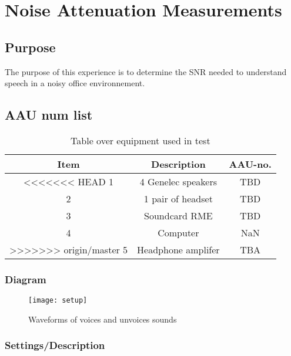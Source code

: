 \section{Noise Attenuation Measurements}

\subsection{Purpose}

The purpose of this experience is to determine the SNR needed to understand speech in a noisy office environnement.

\subsection{AAU num list}

\begin{table}[h]
	\centering
	
	\begin{tabular}{ c c c } \toprule
		{Item} & {Description} & {AAU-no}. \\ \bottomrule 
<<<<<<< HEAD
		1      &  4 Genelec speakers						& TBD	\\
		2      &  1 pair of headset						& TBD		\\
		3      &  Soundcard RME                      	& TBD		\\
		4      &  Computer								   & NaN		\\  

>>>>>>> origin/master
		5      &  Headphone amplifer    				& TBA		\\ \bottomrule 
	\end{tabular}
	\caption{Table over equipment used in test}
	\label{tab:UsedEquipmentListning1}
\end{table}



\subsubsection{Diagram}

\begin{figure}[H]
	\label{fig1}
	\centering
		\texttt{[image: setup]}
		\caption{Waveforms of voices and unvoices sounds}
	\end{figure}


\subsubsection{Settings/Description}

